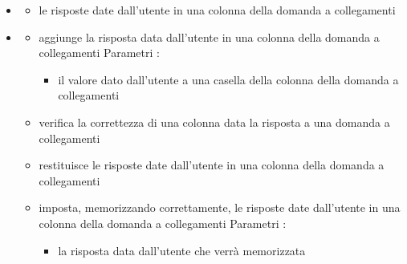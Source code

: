 \begin{itemize}
\item {}
\begin{itemize}
\item {}
\newline
le risposte date dall'utente in una colonna della domanda a collegamenti
\end{itemize}
\item {}
\begin{itemize}
\item {}
\newline
aggiunge la risposta data dall'utente in una colonna della domanda a collegamenti
\newline
Parametri :
\begin{itemize}
\item {}
\newline
il valore dato dall'utente a una casella della colonna della domanda a collegamenti
\end{itemize}
\item {}
\newline
verifica la correttezza di una colonna data la risposta a una domanda a collegamenti
\newline
\item {}
\newline
restituisce le risposte date dall'utente in una colonna della domanda a collegamenti
\newline
\item {}
\newline
imposta, memorizzando correttamente, le risposte date dall'utente in una colonna della domanda a collegamenti
\newline
Parametri :
\begin{itemize}
\item {}
\newline
la risposta data dall'utente che verrà memorizzata
\end{itemize}
\end{itemize}
\end{itemize}
